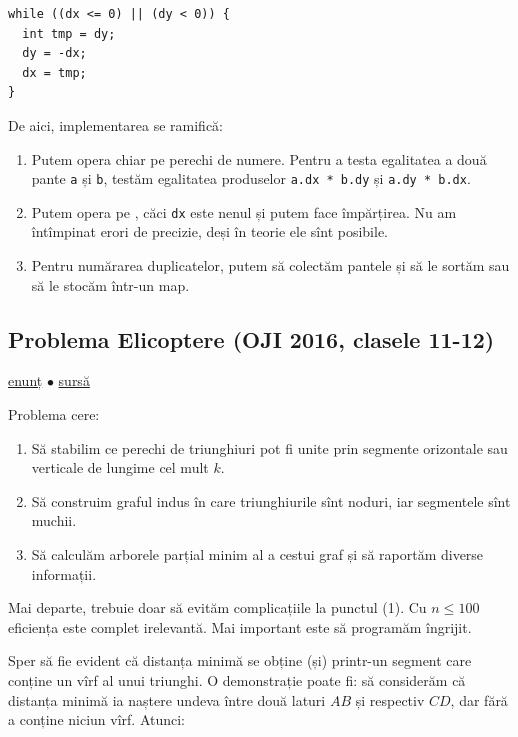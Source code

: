 \documentclass[../main.tex]{subfiles}
\begin{document}
\begin{verbatim}
while ((dx <= 0) || (dy < 0)) {
  int tmp = dy;
  dy = -dx;
  dx = tmp;
}
\end{verbatim}

De aici, implementarea se ramifică:

\begin{enumerate}
  \item Putem opera chiar pe perechi de numere. Pentru a testa egalitatea a două pante \texttt{a} și \texttt{b}, testăm egalitatea produselor \texttt{a.dx * b.dy} și \texttt{a.dy * b.dx}.

  \item Putem opera pe , căci \texttt{dx} este nenul și putem face împărțirea. Nu am întîmpinat erori de precizie, deși în teorie ele sînt posibile.

  \item Pentru numărarea duplicatelor, putem să colectăm pantele și să le sortăm sau să le stocăm într-un map.
\end{enumerate}

\subsection{Problema Elicoptere (OJI 2016, clasele 11-12)}
\label{problem:elicoptere}

\href{https://kilonova.ro/problems/29}{enunț}
$\bullet$
\hyperref[code:elicoptere]{sursă}

Problema cere:

\begin{enumerate}
  \item Să stabilim ce perechi de triunghiuri pot fi unite prin segmente orizontale sau verticale de lungime cel mult $k$.

  \item Să construim graful indus în care triunghiurile sînt noduri, iar segmentele sînt muchii.

  \item Să calculăm arborele parțial minim al a cestui graf și să raportăm diverse informații.
\end{enumerate}

Mai departe, trebuie doar să evităm complicațiile la punctul (1). Cu $n \leq 100$ eficiența este complet irelevantă. Mai important este să programăm îngrijit.

Sper să fie evident că distanța minimă se obține (și) printr-un segment care conține un vîrf al unui triunghi. O demonstrație poate fi: să considerăm că distanța minimă ia naștere undeva între două laturi $AB$ și respectiv $CD$, dar fără a conține niciun vîrf. Atunci:
\end{document}

